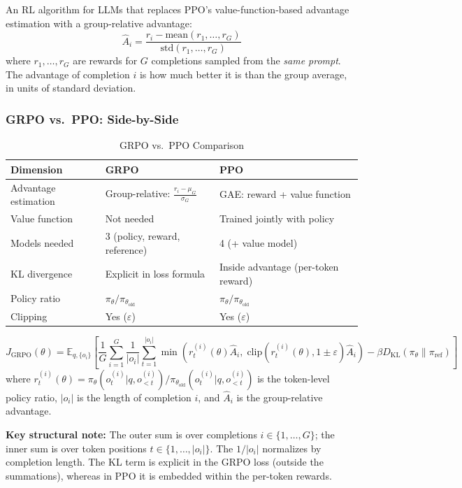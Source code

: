 \documentclass[11pt, a4paper]{article}
\begin{document}
\begin{defbox}
An RL algorithm for LLMs that replaces PPO's value-function-based advantage estimation with a group-relative advantage:
\[
\hat{A}_i = \frac{r_i - \text{mean}(r_1, \ldots, r_G)}{\text{std}(r_1, \ldots, r_G)}
\]
where $r_1, \ldots, r_G$ are rewards for $G$ completions sampled from the \emph{same prompt}. The advantage of completion $i$ is how much better it is than the group average, in units of standard deviation.
\end{defbox}

\subsubsection{GRPO vs.\ PPO: Side-by-Side}

\begin{table}[h]
\centering
\caption{GRPO vs.\ PPO Comparison}
\begin{tabular}{@{}p{4cm}p{4cm}p{5cm}@{}}
\toprule
\textbf{Dimension} & \textbf{GRPO} & \textbf{PPO} \\
\midrule
Advantage estimation & Group-relative: $\frac{r_i - \mu_G}{\sigma_G}$ & GAE: reward + value function \\
Value function & Not needed & Trained jointly with policy \\
Models needed & 3 (policy, reward, reference) & 4 (+ value model) \\
KL divergence & Explicit in loss formula & Inside advantage (per-token reward) \\
Policy ratio & $\pi_\theta / \pi_{\theta_\text{old}}$ & $\pi_\theta / \pi_{\theta_\text{old}}$ \\
Clipping & Yes ($\varepsilon$) & Yes ($\varepsilon$) \\
\bottomrule
\end{tabular}
\end{table}

\begin{mathbox}
\[
J_{\text{GRPO}}(\theta) = \mathbb{E}_{q, \{o_i\}}\!\left[\frac{1}{G}\sum_{i=1}^G \frac{1}{|o_i|}\sum_{t=1}^{|o_i|} \min\!\left(r_t^{(i)}(\theta)\hat{A}_i,\; \text{clip}(r_t^{(i)}(\theta), 1\pm\varepsilon)\hat{A}_i\right) - \beta D_{\text{KL}}(\pi_\theta \| \pi_{\text{ref}})\right]
\]
where $r_t^{(i)}(\theta) = \pi_\theta(o_t^{(i)}|q, o_{<t}^{(i)}) / \pi_{\theta_\text{old}}(o_t^{(i)}|q, o_{<t}^{(i)})$ is the token-level policy ratio, $|o_i|$ is the length of completion $i$, and $\hat{A}_i$ is the group-relative advantage.

\textbf{Key structural note:} The outer sum is over completions $i \in \{1,\ldots,G\}$; the inner sum is over token positions $t \in \{1,\ldots,|o_i|\}$. The $1/|o_i|$ normalizes by completion length. The KL term is explicit in the GRPO loss (outside the summations), whereas in PPO it is embedded within the per-token rewards.
\end{mathbox}
\end{document}
